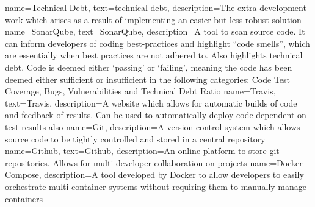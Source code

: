 {
    name={Technical Debt},
    text={technical debt},
    description={The extra development work which arises as a result of implementing an easier but less robust solution}
}
{
    name={SonarQube},
    text={SonarQube},
    description={A tool to scan source code. It can inform developers of coding best-practices and highlight ``code smells'', which are essentially when best practices are not adhered to. Also highlights technical debt. Code is deemed either `passing' or `failing', meaning the code has been deemed either sufficient or insufficient in the following categories: Code Test Coverage, Bugs, Vulnerabilities and Technical Debt Ratio}
}
{
    name={Travis},
    text={Travis},
    description={A website which allows for automatic builds of code and feedback of results. Can be used to automatically deploy code dependent on test results also}
}
{
    name={Git},
    description={A version control system which allows source code to be tightly controlled and stored in a central repository}
}
{
    name={Github},
    text={Github},
    description={An online platform to store git repositories. Allows for multi-developer collaboration on projects}
}
{
    name={Docker Compose},
    description={A tool developed by Docker to allow developers to easily orchestrate multi-container systems without requiring them to manually manage containers}
}
